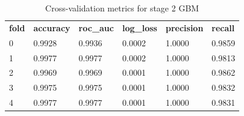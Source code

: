 \documentclass{article}
\begin{document}
\begin{table}[]
\begin{tabular}{llllll}
\textbf{fold} & \textbf{accuracy} & \textbf{roc\_auc} & \textbf{log\_loss} & \textbf{precision} & \textbf{recall} \\
0             & 0.9928            & 0.9936            & 0.0002             & 1.0000             & 0.9859          \\
1             & 0.9977            & 0.9977            & 0.0002             & 1.0000             & 0.9813          \\
2             & 0.9969            & 0.9969            & 0.0001             & 1.0000             & 0.9862          \\
3             & 0.9975            & 0.9975            & 0.0001             & 1.0000             & 0.9832          \\
4             & 0.9977            & 0.9977            & 0.0001             & 1.0000             & 0.9831         
\end{tabular}
\caption{Cross-validation metrics for stage 2 GBM}
\end{table}
\end{document}
